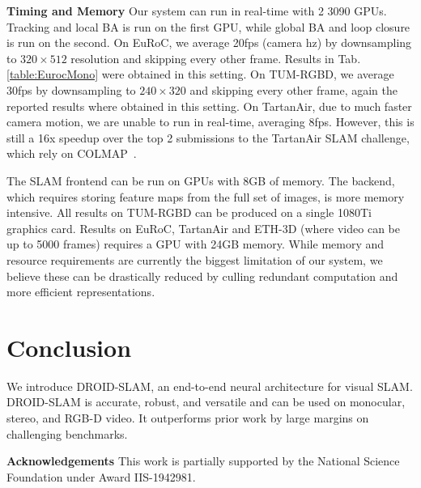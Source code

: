 \documentclass{article}
\newcommand{\methodname}{DROID-SLAM}
\begin{document}
\noindent \textbf{Timing and Memory} Our system can run in real-time with 2 3090 GPUs. Tracking and local BA is run on the first GPU, while global BA and loop closure is run on the second. On EuRoC, we average 20fps (camera hz) by downsampling to $320\times512$ resolution and skipping every other frame. Results in Tab. \ref{table:EurocMono} were obtained in this setting. On TUM-RGBD, we average 30fps by downsampling to $240\times320$ and skipping every other frame, again the reported results where obtained in this setting. On TartanAir, due to much faster camera motion, we are unable to run in real-time, averaging 8fps. However, this is still a 16x speedup over the top 2 submissions to the TartanAir SLAM challenge, which rely on COLMAP~\cite{colmap}.

The SLAM frontend can be run on GPUs with 8GB of memory. The backend, which requires storing feature maps from the full set of images, is more memory intensive.  All results on TUM-RGBD can be produced on a single 1080Ti graphics card. Results on EuRoC, TartanAir and ETH-3D (where video can be up to 5000 frames) requires a GPU with 24GB memory. While memory and resource requirements are currently the biggest limitation of our system, we believe these can be drastically reduced by culling redundant computation and more efficient representations.

\section{Conclusion}
We introduce \methodname{}, an end-to-end neural architecture for visual SLAM. \methodname{} is accurate, robust, and versatile and can be used on monocular, stereo, and RGB-D video. It outperforms prior work by large margins on challenging benchmarks.

\noindent \textbf{Acknowledgements} This work is partially supported by the National Science Foundation under Award IIS-1942981.

{\small


}


\clearpage





\end{document}
